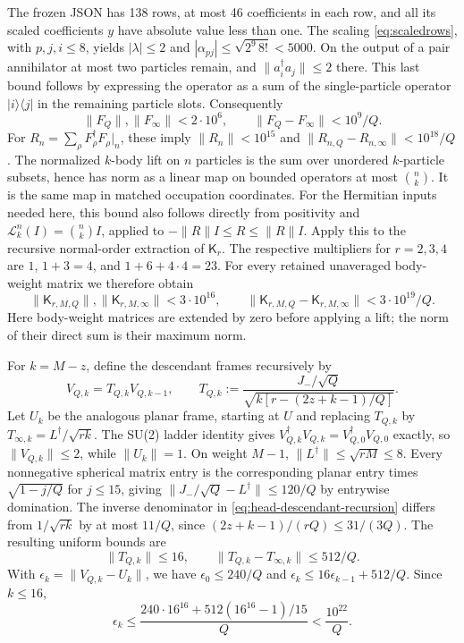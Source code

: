 \documentclass[11pt]{article}
\begin{document}
The frozen JSON has 138 rows, at most 46 coefficients in each row, and
all its scaled coefficients $y$ have absolute value less than one. The
scaling \eqref{eq:scaledrows}, with $p,j,i\le8$, yields
$|\lambda|\le2$ and
$|\alpha_{pj}|\le\sqrt{2^9\,8!}<5000$. On the output of a pair
annihilator at most two particles remain, and
$\|a_i^\dagger a_j\|\le2$ there. This last bound follows by expressing
the operator as a sum of the single-particle operator
$|i\rangle\langle j|$ in the remaining particle slots. Consequently
\begin{equation}\label{eq:head-row-bounds}
 \|F_Q\|,\|F_\infty\|<2\cdot10^6,\qquad
 \|F_Q-F_\infty\|<10^9/Q.
\end{equation}
For $R_n=\sum_\rho F_\rho^\dagger F_\rho|_n$, these imply
$\|R_n\|<10^{15}$ and $\|R_{n,Q}-R_{n,\infty}\|<10^{18}/Q$.
The normalized $k$-body lift on $n$ particles is the sum over unordered
$k$-particle subsets, hence has norm as a linear map on bounded operators
at most $\binom nk$. It is the same map in matched occupation coordinates.
For the Hermitian inputs needed here, this bound also follows directly
from positivity and $\mathcal L_k^n(I)=\binom nk I$, applied to
$-\|R\|I\le R\le\|R\|I$.
Apply this to the recursive normal-order extraction of $\mathsf K_r$.
The respective multipliers for $r=2,3,4$ are
$1$, $1+3=4$, and $1+6+4\cdot4=23$. For every retained unaveraged
body-weight matrix we therefore obtain
\begin{equation}\label{eq:head-K-bounds}
 \|\mathsf K_{r,M,Q}\|,\|\mathsf K_{r,M,\infty}\|<3\cdot10^{16},
 \qquad
 \|\mathsf K_{r,M,Q}-\mathsf K_{r,M,\infty}\|<3\cdot10^{19}/Q.
\end{equation}
Here body-weight matrices are extended by zero before applying a lift;
the norm of their direct sum is their maximum norm.

For $k=M-z$, define the descendant frames recursively by
\begin{equation}\label{eq:head-descendant-recursion}
 V_{Q,k}=T_{Q,k}V_{Q,k-1},\qquad
 T_{Q,k}:=\frac{J_-/\sqrt Q}
 {\sqrt{k[r-(2z+k-1)/Q]}}.
\end{equation}
Let $U_k$ be the analogous planar frame, starting at $U$ and replacing
$T_{Q,k}$ by $T_{\infty,k}=L^\dagger/\sqrt{rk}$. The SU(2) ladder
identity gives $V_{Q,k}^\dagger V_{Q,k}=V_{Q,0}^\dagger V_{Q,0}$
exactly, so $\|V_{Q,k}\|\le2$, while $\|U_k\|=1$.
On weight $M-1$, $\|L^\dagger\|\le\sqrt{rM}\le8$. Every nonnegative
spherical matrix entry is the corresponding planar entry times
$\sqrt{1-j/Q}$ for $j\le15$, giving
$\|J_-/\sqrt Q-L^\dagger\|\le120/Q$ by entrywise domination.
The inverse denominator in \eqref{eq:head-descendant-recursion} differs
from $1/\sqrt{rk}$ by at most $11/Q$, since
$(2z+k-1)/(rQ)\le31/(3Q)$. The resulting uniform bounds are
\begin{equation}
 \|T_{Q,k}\|\le16,\qquad
 \|T_{Q,k}-T_{\infty,k}\|\le512/Q.
\end{equation}
With $\epsilon_k=\|V_{Q,k}-U_k\|$, we have
$\epsilon_0\le240/Q$ and
$\epsilon_k\le16\epsilon_{k-1}+512/Q$. Since $k\le16$,
\begin{equation}\label{eq:head-descendant-bound}
 \epsilon_k\le\frac{240\cdot16^{16}
       +512(16^{16}-1)/15}{Q}<\frac{10^{22}}Q.
\end{equation}
\end{document}
